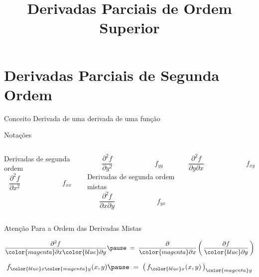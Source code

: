 \documentclass[fleqn,utf8,aspectratio=169,12pt]{beamer}
\title{Derivadas Parciais de Ordem Superior}
\begin{document}
\addtitle

\section{Derivadas Parciais de Segunda Ordem}

\begin{frame}{Conceito}
  Derivada de uma derivada de uma função
\end{frame}

\begin{frame}{Notações}
\begin{columns}[t]
  Derivadas de segunda ordem
  \pause
  \bigskip
  \[
    \frac{\partial^2 f}{\partial x^2} \qquad\qquad\qquad
    f_{xx}
  \]

  \pause
  \bigskip
  \[
    \frac{\partial^2 f}{\partial y^2} \qquad\qquad\qquad
    f_{yy}
  \]
  \pause
  \bigskip
  Derivadas de segunda ordem mistas
  \[
    \frac{\partial^2 f}{\partial x \partial y} \qquad\qquad\qquad
    f_{yx}
  \]

  \pause
  \bigskip
  \[
    \frac{\partial^2 f}{\partial y \partial x} \qquad\qquad\qquad
    f_{xy}
  \]
\end{columns}
\end{frame}

\begin{frame}{Atenção Para a Ordem das Derivadas Mistas}

  { \Large
  \[
    \frac{\partial^2 f}{{\color{magenta} \partial x} {\color{blue} \partial y}}
    \pause
    \;=\; \frac{\partial}{{\color{magenta} \partial x}}
          \left(\,\frac{\partial f}{{\color{blue} \partial y}}\,\right)
  \]

  \pause
  \bigskip
  \[
    f_{{\color{blue} x}{\color{magenta} y}} (x, y)
    \pause
    \;=\; \big(\,f_{\color{blue} x} (x, y)\,\big)_{\color{magenta} y}
  \]}
\end{frame}




\end{document}
